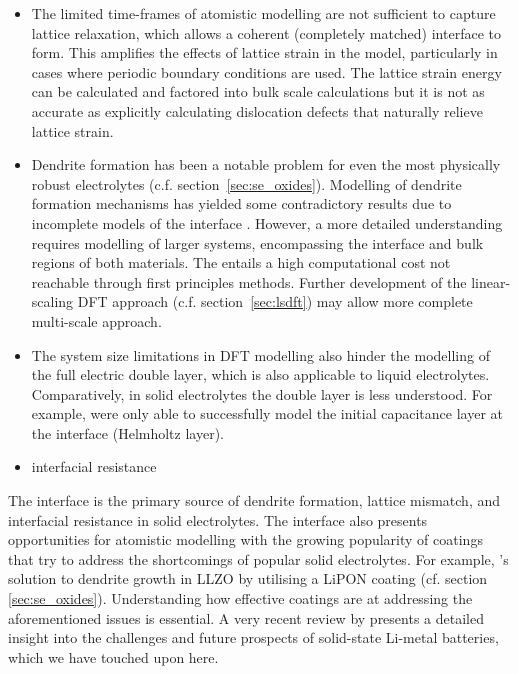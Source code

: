 \documentclass[../main.tex]{subfiles}
\begin{document}
\begin{itemize}
    \item The limited time-frames of atomistic modelling are not sufficient to capture lattice relaxation, which allows a coherent (completely matched) interface to form. This amplifies the effects of lattice strain in the model, particularly in cases where periodic boundary conditions are used. \cite{Lepley2015} The lattice strain energy can be calculated and factored into bulk scale calculations but it is not as accurate as explicitly calculating dislocation defects that naturally relieve lattice strain.\cite{Rodney2017, Clouet2020}
    \item Dendrite formation has been a notable problem for even the most physically robust electrolytes (c.f. section~\ref{sec:se_oxides}). Modelling of dendrite formation mechanisms has yielded some contradictory results due to incomplete models of the interface \cite{Tian2018, Gao2020, Canepa2018}. However, a more detailed understanding requires modelling of larger systems, encompassing the interface and bulk regions of both materials. The entails a high computational cost not reachable through first principles methods. Further development of the linear-scaling DFT approach (c.f. section~\ref{sec:lsdft}) may allow more complete multi-scale approach.
    \item The system size limitations in DFT modelling also hinder the modelling of the full electric double layer, which is also applicable to liquid electrolytes. Comparatively, in solid electrolytes the double layer is less understood. For example, \citeauthor{Tateyama2019} were only able to successfully model the initial capacitance layer at the interface (Helmholtz layer).\cite{Tateyama2019}
    \item interfacial resistance 
\end{itemize}

The interface is the primary source of dendrite formation, lattice mismatch, and interfacial resistance in solid electrolytes. The interface also presents opportunities for atomistic modelling with the growing popularity of coatings that try to address the shortcomings of popular solid electrolytes.\cite{Kim2020, Xu2018exp, Chen2020se_coat, Ito2017, Yin2020, Ji2020coating, Li2020coating, Yi2021coating, Dai2021coating, Pan2020coating, Jing2020coating, Wang2021coating, Zhao2020coating, Zhao2021coating, Liang2020coating, Zhang2020coating} For example, \citeauthor{Tian2018}'s solution to dendrite growth in LLZO by utilising a LiPON coating\cite{Tian2018} (cf. section \ref{sec:se_oxides}). Understanding how effective coatings are at addressing the aforementioned issues is essential. \cite{Zhang2020directvis, Xiao2019coat, Tian2018} A very recent review by \citeauthor{kim2021solid} presents a detailed insight into the challenges and future prospects of solid-state Li-metal batteries, which we have touched upon here.\cite{kim2021solid}
\end{document}
